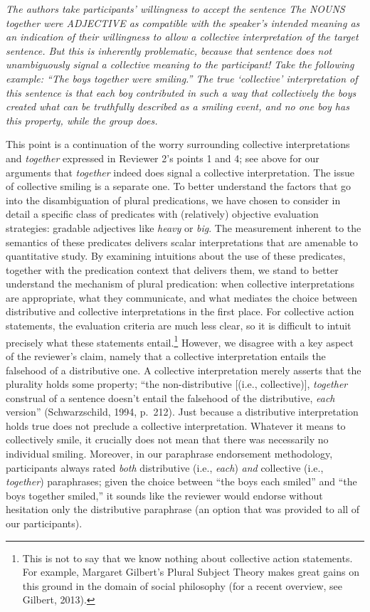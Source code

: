 \documentclass[12pt]{article}
\begin{document}
\item \emph{The authors take participants' willingness to accept the sentence \emph{The NOUNS together were ADJECTIVE} as compatible with the speaker's intended meaning as an indication of their willingness to allow a collective interpretation of the target sentence. But this is inherently problematic, because that sentence does not unambiguously signal a collective meaning to the participant! Take the following example: ``The boys together were smiling.'' The true `collective' interpretation of this sentence is that each boy contributed in such a way that collectively the boys created what can be truthfully described as a smiling event, and no one boy has this property, while the group does.}

This point is a continuation of the worry surrounding collective interpretations and \emph{together} expressed in Reviewer 2's points 1 and 4; see above for our arguments that \emph{together} indeed does signal a collective interpretation. The issue of collective smiling is a separate one. To better understand the factors that go into the disambiguation of plural predications, we have chosen to consider in detail a specific class of predicates with (relatively) objective evaluation strategies: gradable adjectives like \emph{heavy} or \emph{big}. 
The measurement inherent to the semantics of these predicates delivers scalar interpretations that are amenable to quantitative study. By examining intuitions about the use of these predicates, together with the predication context that delivers them, we stand to better understand the mechanism of plural predication: when collective interpretations are appropriate, what they communicate, and what mediates the choice between distributive and collective interpretations in the first place. For collective action statements, the evaluation criteria are much less clear, so it is difficult to intuit precisely what these statements entail.\footnote{This is not to say that we know nothing about collective action statements. For example, Margaret Gilbert's Plural Subject Theory makes great gains on this ground in the domain of social philosophy (for a recent overview, see Gilbert, 2013).} However, we disagree with a key aspect of the reviewer's claim, namely that a collective interpretation entails the falsehood of a distributive one. A collective interpretation merely asserts that the plurality holds some property; ``the non-distributive [(i.e., collective)], \emph{together} construal of a sentence doesn't entail the falsehood of the distributive, \emph{each} version'' (Schwarzschild, 1994, p.~212). Just because a distributive interpretation holds true does not preclude a collective interpretation. Whatever it means to collectively smile, it crucially does not mean that there was necessarily no individual smiling. Moreover, in our paraphrase endorsement methodology, participants always rated \emph{both} distributive (i.e., \emph{each}) \emph{and} collective (i.e., \emph{together}) paraphrases; given the choice between ``the boys each smiled'' and ``the boys together smiled,'' it sounds like the reviewer would endorse without hesitation only the distributive paraphrase (an option that was provided to all of our participants).
\end{document}

